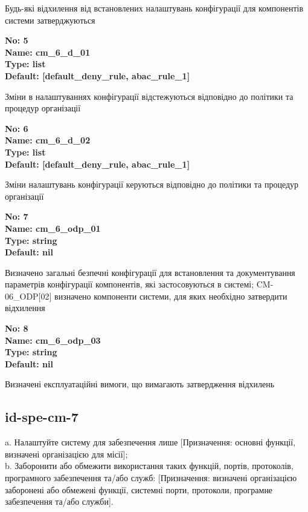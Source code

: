 \documentclass{article}
\begin{document}
{\footnotesize Будь-які відхилення від встановлених налаштувань конфігурації для компонентів системи затверджуються}


{\footnotesize\bfseries
No: 5\\
Name: cm\_\allowbreak{}6\_\allowbreak{}d\_\allowbreak{}01\\
Type: list\\
Default: [\textquotedbl{}default\_\allowbreak{}deny\_\allowbreak{}rule\textquotedbl{}, \textquotedbl{}abac\_\allowbreak{}rule\_\allowbreak{}1\textquotedbl{}]
}

{\footnotesize Зміни в налаштуваннях конфігурації відстежуються відповідно до політики та процедур організації}


{\footnotesize\bfseries
No: 6\\
Name: cm\_\allowbreak{}6\_\allowbreak{}d\_\allowbreak{}02\\
Type: list\\
Default: [\textquotedbl{}default\_\allowbreak{}deny\_\allowbreak{}rule\textquotedbl{}, \textquotedbl{}abac\_\allowbreak{}rule\_\allowbreak{}1\textquotedbl{}]
}

{\footnotesize Зміни налаштувань конфігурації керуються відповідно до політики та процедур організації}


{\footnotesize\bfseries
No: 7\\
Name: cm\_\allowbreak{}6\_\allowbreak{}odp\_\allowbreak{}01\\
Type: string\\
Default: nil
}

{\footnotesize Визначено загальні безпечні конфігурації для встановлення та документування параметрів конфігурації компонентів, які застосовуються в системі; CM-06\_\allowbreak{}ODP[02] визначено компоненти системи, для яких необхідно затвердити відхилення}


{\footnotesize\bfseries
No: 8\\
Name: cm\_\allowbreak{}6\_\allowbreak{}odp\_\allowbreak{}03\\
Type: string\\
Default: nil
}

{\footnotesize Визначені експлуатаційні вимоги, що вимагають затвердження відхилень}




\subsection{id-spe-cm-7}
a. Налаштуйте систему для забезпечення лише [Призначення: основні функції, визначені організацією для місії];\\ 
b. Заборонити або обмежити використання таких функцій, портів, протоколів, програмного забезпечення та/або служб: [Призначення: визначені організацією заборонені або обмежені функції, системні порти, протоколи, програмне забезпечення та/або служби].
\end{document}
